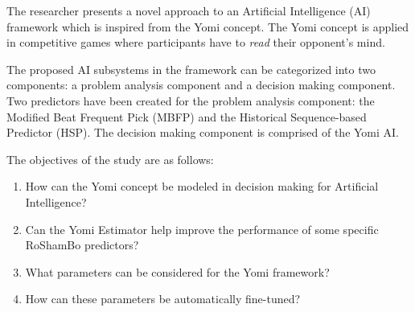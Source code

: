 
The researcher presents a novel approach to an Artificial Intelligence (AI) framework which is inspired from the Yomi concept. The Yomi concept is applied in competitive games where participants have to \textit{read} their opponent's mind.

The proposed AI subsystems in the framework can be categorized into two components: a problem analysis component and a decision making component. Two predictors have been created for the problem analysis component: the Modified Beat Frequent Pick (MBFP) and the Historical Sequence-based Predictor (HSP). The decision making component is comprised of the Yomi AI.

The objectives of the study are as follows:

\begin{enumerate}[label=\arabic*.]

\item How can the Yomi concept be modeled in decision making for Artificial Intelligence?

\item Can the Yomi Estimator help improve the performance of some specific RoShamBo predictors?

\item What parameters can be considered for the Yomi framework?

\item How can these parameters be automatically fine-tuned?

\end{enumerate}
